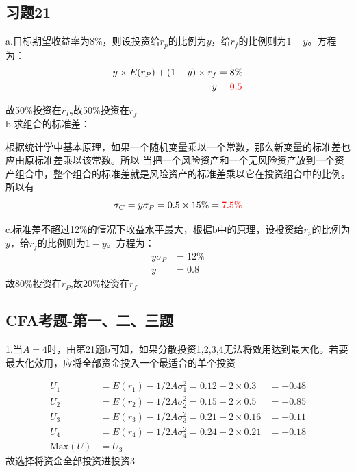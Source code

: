 \documentclass{article}
\begin{document}
\subsection*{习题21}
a.目标期望收益率为$8\%$，则设投资给$r_p$的比例为$y$，给$r_f$的比例则为$1-y$。方程为：
\begin{align}
    y\times E(r_P)+(1-y)\times r_f&=8\%\nonumber\\
    y&={\color{red}0.5}\nonumber
\end{align}

故50\%投资在$r_P$,故50\%投资在$r_f$\\

b.求组合的标准差：

根据统计学中基本原理，如果一个随机变量乘以一个常数，那么新变量的标准差也应由原标准差乘以该常数。所以
当把一个风险资产和一个无风险资产放到一个资产组合中，整个组合的标准差就是风险资产的标准差乘以它在投资组合中的比例。所以有
\[\sigma_C=y\sigma_P=0.5\times 15\%={\color{red}7.5\%}\]

c.标准差不超过12\%的情况下收益水平最大，根据b中的原理，设投资给$r_p$的比例为$y$，给$r_f$的比例则为$1-y$。方程为：
\begin{align}
    y\sigma_P&=12\%\nonumber\\
    y&=0.8
\end{align}
故{\color{red}80\%投资在$r_P$,故20\%投资在$r_f$}\\
\clearpage
\subsection*{CFA考题-第一、二、三题}
1.当$A=4$时，由第21题b可知，如果分散投资1,2,3,4无法将效用达到最大化。若要最大化效用，应将全部资金投入一个最适合的单个投资
\begin{tcolorbox}
    [colback=greenshade,colframe=Green,title=\textbf{计算：}]
    \begin{align}
        U_1&=E(r_1)-1/2A\sigma_1^2=0.12-2\times0.3 &=-0.48\nonumber\\
        U_2&=E(r_2)-1/2A\sigma_2^2=0.15-2\times0.5&=-0.85\nonumber\\
        U_3&=E(r_3)-1/2A\sigma_3^2=0.21-2\times0.16&=-0.11\nonumber\\
        U_4&=E(r_4)-1/2A\sigma_4^2=0.24-2\times0.21&=-0.18\nonumber\\
        \text{Max}(U)&=U_3\nonumber
    \end{align}
    故选择{\color{red}将资金全部投资进投资3}
\end{tcolorbox}
\end{document}
